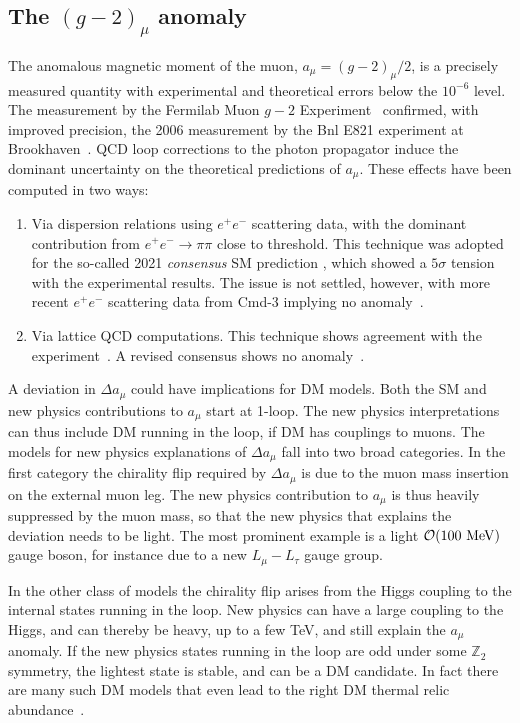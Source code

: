 \subsection{The $(g-2)_\mu$ anomaly}
\label{sec:g-2}
The anomalous magnetic moment of the muon, $a_\mu=(g-2)_\mu/2$, 
is a precisely measured quantity with experimental and theoretical errors below the $10^{-6}$ level. 
The measurement by the {\sc Fermilab} Muon $g-2$ Experiment~\cite{muong-2measurements}  confirmed, with improved precision,
the  2006 measurement by the  {\sc Bnl} E821 experiment at Brookhaven~\cite{muong-2measurements}. 
QCD loop corrections to the photon propagator induce
the dominant uncertainty on the theoretical predictions of $a_\mu$.
These effects have been computed in two ways:
\begin{enumerate}
\item Via dispersion relations using $e^+e^-$ scattering data,
with the dominant contribution from $e^+ e^-\to \pi\pi$ close to threshold. 
This technique was adopted for the so-called 2021 {\em consensus} SM prediction \cite{MuonConsensus},
which showed a  $5\sigma$ tension with the experimental results.
The issue is not settled, however, with more recent $e^+e^-$ scattering data from {\sc Cmd}-3 implying no anomaly~\cite{CMD-3}.
\item Via lattice QCD computations. This technique shows agreement with the experiment~\cite{BMW}.
A revised consensus shows no anomaly~\cite{MuonConsensus}.
\end{enumerate}
A  deviation in $\Delta a_\mu$ could have implications for DM models. Both the SM and new physics contributions to $a_\mu$ start at 1-loop. The new physics interpretations can thus include DM running in the loop, if DM has couplings to muons. The models for new physics explanations of $\Delta a_\mu$ fall into two broad categories. In the first category the chirality flip required by $\Delta a_\mu$ is due to the muon mass insertion on the external muon leg. The new physics contribution to $a_\mu$ is thus heavily suppressed by the muon mass, so that the new physics that explains the deviation needs to be light. The most prominent example is a light ${\mathcal O}(100~{\rm MeV})$ gauge boson, for instance due to a new $L_\mu-L_\tau$ gauge group. 


In the other class of models the chirality flip arises from the Higgs coupling to the internal states running in the loop. 
New physics can have a large coupling to the Higgs, and can thereby be
heavy, up to a few TeV, and still explain the $a_\mu$ anomaly.
If the new physics states running  in the loop are odd under some $\mathbb{Z}_2$ symmetry, 
the lightest state is stable, and can be a DM candidate. In fact there are many such DM models that even lead to the right DM thermal relic abundance~\cite{muong-2models}. 

